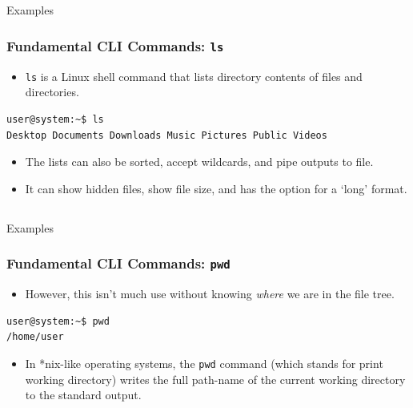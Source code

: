 \documentclass[10pt]{beamer}
\begin{document}
\subsection{}
\begin{frame}[fragile]{Examples}
\frametitle{Fundamental CLI Commands: \texttt{ls}}
\begin{itemize}
\item \texttt{ls} is a Linux shell command that lists directory contents of files and directories.\vspace{0.2in}
\end{itemize}
\begin{lstlisting}[style=BashInputStyle]
user@system:~$ ls
Desktop Documents Downloads Music Pictures Public Videos
\end{lstlisting}
\vspace{0.1in}
\begin{itemize}
\item The lists can also be sorted, accept wildcards, and pipe outputs to file. \vspace{0.1in}
\item It can show hidden files, show file size, and has the option for a `long' format.\vspace{0.1in}
\end{itemize}
\end{frame}

\subsection{}
\begin{frame}[fragile]{Examples}
\frametitle{Fundamental CLI Commands: \texttt{pwd}}
\begin{itemize}
\item However, this isn't much use without knowing \emph{where} we are in the file tree. \vspace{0.2in}
\end{itemize}
\begin{lstlisting}[style=BashInputStyle]
user@system:~$ pwd
/home/user
\end{lstlisting}
\vspace{0.1in}
\begin{itemize}
\item In *nix-like operating systems, the \texttt{pwd} command (which stands for print working directory) writes the full path-name of the current working directory to the standard output.\\
\end{itemize}
\end{frame}
\end{document}
